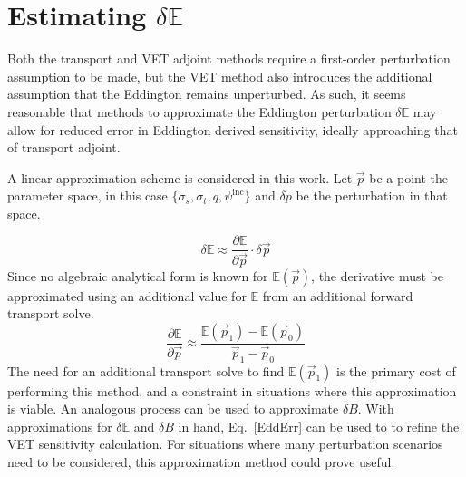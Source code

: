 \documentclass[12pt]{report}
\newcommand{\vp}{\vec{p}}
\newcommand{\Edd}{\mathbb{E}}
\newcommand{\BEdd}{B}
\begin{document}
\section{Estimating $\delta \Edd$}
Both the transport and VET adjoint methods require a first-order perturbation assumption to be made, but the VET method also introduces the additional assumption that the Eddington remains unperturbed. As such, it seems reasonable that methods to approximate the Eddington perturbation $\delta \Edd$ may allow for reduced error in Eddington derived sensitivity, ideally approaching that of transport adjoint. 

A linear approximation scheme is considered in this work. Let $\vp$ be a point the  parameter space, in this case $\lbrace \sigma_s , \sigma_t, q, \psi^{\text{inc}} \rbrace$ and $\delta p$ be the perturbation in that space.

\begin{equation}
\delta \Edd \approx \frac{\partial \Edd}{\partial \vp} \cdot \delta \vp
\end{equation}
Since no algebraic analytical form is known for $\Edd ( \vp )$, the derivative must be approximated using an additional value for $\Edd$ from an additional forward transport solve.
\begin{equation}
\label{Eddapprox}
\frac{\partial \Edd}{\partial \vp} \approx \frac{\Edd(\vp_1) - \Edd(\vp_0)}{\vp_1 - \vp_0}
\end{equation}
The need for an additional transport solve to find $\Edd(\vp_1)$ is the primary cost of performing this method, and a constraint in situations where this approximation is viable. An analogous process can be used to approximate $\delta \BEdd$. With approximations for $\delta \Edd$ and $\delta \BEdd$ in hand, Eq.~\eqref{EddErr} can be used to to refine the VET sensitivity calculation. For situations where many perturbation scenarios need to be considered, this approximation method could prove useful. 

\end{document}

